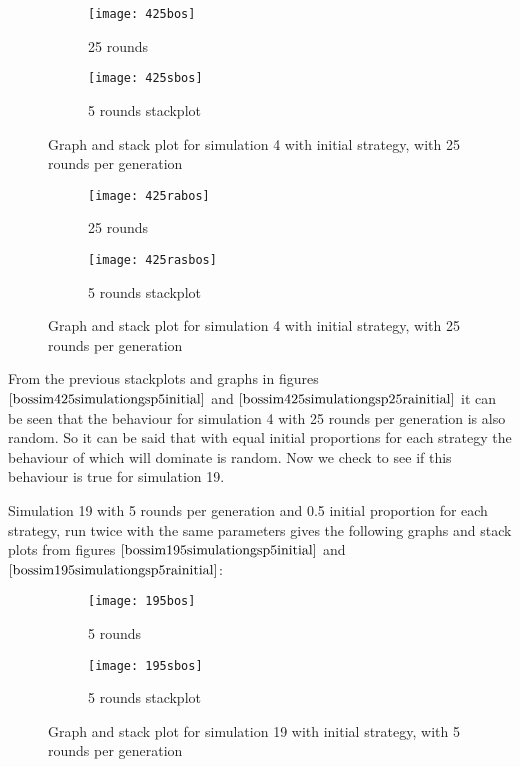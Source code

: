 \begin{figure}[H]       
    \centering
    \begin{subfigure}[b]{0.3\textwidth}
	\centering
	{\texttt{[image: 425bos]}}   
    	\caption{25 rounds}
	\label{fig:bossim425bos}
    \end{subfigure}
    \hfill
    \begin{subfigure}[b]{0.3\textwidth}
	\centering
	{\texttt{[image: 425sbos]}}   
    	\caption{5 rounds stackplot}
	\label{fig:bossim425sbos}
    \end{subfigure}
    \caption{Graph and stack plot for simulation 4 with initial strategy, with 25 rounds per generation}
    \label{bossim425simulationgsp5initial}
\end{figure}

\begin{figure}[H]       
    \centering
    \begin{subfigure}[b]{0.3\textwidth}
	\centering
	{\texttt{[image: 425rabos]}}   
    	\caption{25 rounds}
	\label{fig:bossim425rabos}
    \end{subfigure}
    \hfill
    \begin{subfigure}[b]{0.3\textwidth}
	\centering
	{\texttt{[image: 425rasbos]}}   
    	\caption{5 rounds stackplot}
	\label{fig:bossim425rasbos}
    \end{subfigure}
    \caption{Graph and stack plot for simulation 4 with initial strategy, with 25 rounds per generation}
    \label{bossim425simulationgsp25rainitial}
\end{figure}
From the previous stackplots and graphs in figures $\ref{bossim425simulationgsp5initial}$ and $\ref{bossim425simulationgsp25rainitial}$ it can be seen that the behaviour for simulation 4 with 25 rounds per generation is also random. So it  can be said that with equal initial proportions for each strategy the behaviour of which will dominate is random. Now we check to  see if this behaviour is true for simulation 19. 

Simulation 19 with 5 rounds per generation and 0.5 initial proportion for each strategy, run twice with the same parameters gives the following graphs and stack plots from figures $\ref{bossim195simulationgsp5initial}$ and $\ref{bossim195simulationgsp5rainitial}$:
\begin{figure}[H]       
    \centering
    \begin{subfigure}[b]{0.3\textwidth}
	\centering
	{\texttt{[image: 195bos]}}   
    	\caption{5 rounds}
	\label{fig:bossim195r5}
    \end{subfigure}
    \hfill
    \begin{subfigure}[b]{0.3\textwidth}
	\centering
	{\texttt{[image: 195sbos]}}   
    	\caption{5 rounds stackplot}
	\label{fig:bossim195rs5}
    \end{subfigure}
    \caption{Graph and stack plot for simulation 19 with initial strategy, with 5 rounds per generation}
    \label{bossim195simulationgsp5initial}
\end{figure}

